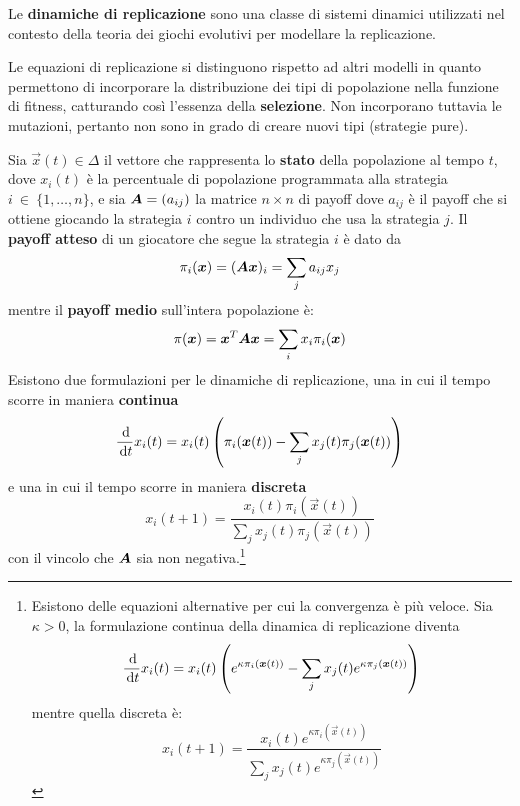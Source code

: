 Le \textbf{dinamiche di replicazione} sono una classe di sistemi dinamici utilizzati nel contesto della teoria dei giochi evolutivi per modellare la replicazione. 

Le equazioni di replicazione si distinguono rispetto ad altri modelli in quanto permettono di incorporare la distribuzione dei tipi di popolazione nella funzione di fitness, catturando così l'essenza della \textbf{selezione}. Non incorporano tuttavia le mutazioni, pertanto non sono in grado di creare nuovi tipi (strategie pure).

Sia $\vec{x}(t) \in \Delta$ il vettore che rappresenta lo \textbf{stato} della popolazione al tempo $t$, dove $x_i(t)$ è la percentuale di popolazione programmata alla strategia $i~\in~\{1, \dots, n\}$, e sia $\mat{A} = (a_{ij})$ la matrice $n \times n$ di payoff dove $a_{ij}$ è il payoff che si ottiene giocando la strategia $i$ contro un individuo che usa la strategia $j$. Il \textbf{payoff atteso} di un giocatore che segue la strategia $i$ è dato da
\begin{displaymath}
	\pi_i(\vec{x}) = (\mat{A} \vec{x})_i = \sum_j a_{ij} x_j
\end{displaymath}
mentre il \textbf{payoff medio} sull'intera popolazione è:
\begin{displaymath}
	\pi(\vec{x}) = \vec{x}^T \mat{A} \vec{x} = \sum_i x_i \pi_i(\vec{x})
\end{displaymath}
Esistono due formulazioni per le dinamiche di replicazione, una in cui il tempo scorre in maniera \textbf{continua}
\begin{displaymath}
	\frac{\dif}{\dif t} x_i(t) = x_i(t) \left(\pi_i(\vec{x}(t)) - \sum_j x_j(t) \pi_j(\vec{x}(t)) \right)
\end{displaymath}
e una in cui il tempo scorre in maniera \textbf{discreta}
\begin{displaymath}
	x_i(t + 1) = \frac{x_i(t) \pi_i(\vec{x}(t))}{\sum_j x_j(t) \pi_j(\vec{x}(t))}
\end{displaymath}
con il vincolo che $\mat{A}$ sia non negativa.\footnote{
	Esistono delle equazioni alternative per cui la convergenza è più veloce. Sia $\kappa > 0$, la formulazione continua della dinamica di replicazione diventa
	\begin{displaymath}
		\frac{\dif}{\dif t} x_i(t) = x_i(t) \left(e^{\kappa \pi_i(\vec{x}(t))} - \sum_j x_j(t) e^{\kappa \pi_j(\vec{x}(t))} \right)
	\end{displaymath}
	mentre quella discreta è:
	\begin{displaymath}
		x_i(t + 1) = \frac{x_i(t) e^{\kappa \pi_i(\vec{x}(t))}}{\sum_j x_j(t) e^{\kappa \pi_j(\vec{x}(t))}}
	\end{displaymath}
}

